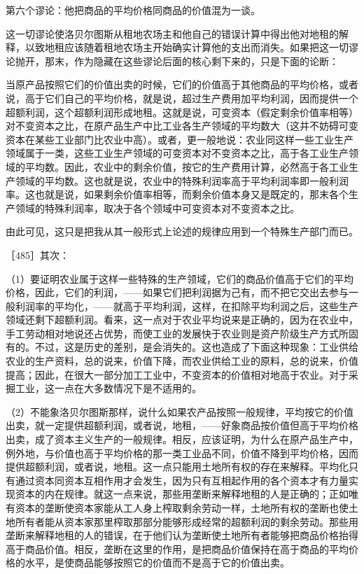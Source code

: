 第六个谬论：他把商品的平均价格同商品的价值混为一谈。

这一切谬论使洛贝尔图斯从租地农场主和他自己的错误计算中得出他对地租的解释，以致地租应该随着租地农场主开始确实计算他的支出而消失。如果把这一切谬论抛开，那末，作为隐藏在这些谬论后面的核心剩下来的，只是下面的论断：

当原产品按照它们的价值出卖的时候，它们的价值高于其他商品的平均价格，或者说，高于它们自己的平均价格，就是说，超过生产费用加平均利润，因而提供一个超额利润，这个超额利润形成地租。这就是说，可变资本（假定剩余价值率相等）对不变资本之比，在原产品生产中比工业各生产领域的平均数大（这并不妨碍可变资本在某些工业部门比农业中高）。或者，更一般地说：农业同这样一些工业生产领域属于一类，这些工业生产领域的可变资本对不变资本之比，高于各工业生产领域的平均数。因此，农业中的剩余价值，按它的生产费用计算，必然高于各工业生产领域的平均数。这也就是说，农业中的特殊利润率高于平均利润率即一般利润率。这也就是说，如果剩余价值率相等，而剩余价值本身又是既定的，那末各个生产领域的特殊利润率，取决于各个领域中可变资本对不变资本之比。

由此可见，这只是把我从其一般形式上论述的规律应用到一个特殊生产部门而已。

［485］其次：

（1）要证明农业属于这样一些特殊的生产领域，它们的商品价值高于它们的平均价格，因此，它们的利润，——如果它们把利润据为己有，而不把它交出去参与一般利润率的平均化，——就高于平均利润，这样，在扣除平均利润之后，这些生产领域还剩下超额利润。看来，这一点对于农业平均说来是正确的，因为在农业中，手工劳动相对地说还占优势，而使工业的发展快于农业则是资产阶级生产方式所固有的。不过，这是历史的差别，是会消失的。这也造成了下面这种现象：工业供给农业的生产资料，总的说来，价值下降，而农业供给工业的原料，总的说来，价值提高；因此，在很大一部分加工工业中，不变资本的价值相对地高于农业。对于采掘工业，这一点在大多数情况下是不适用的。

（2）不能象洛贝尔图斯那样，说什么如果农产品按照一般规律，平均按它的价值出卖，就一定提供超额利润，或者说，地租，——好象商品按价值但高于平均价格出卖，成了资本主义生产的一般规律。相反，应该证明，为什么在原产品生产中，例外地，与价值也高于平均价格的那一类工业品不同，价值不降到平均价格，因而提供超额利润，或者说，地租。这一点只能用土地所有权的存在来解释。平均化只有通过资本同资本互相作用才会发生，因为只有互相起作用的各个资本才有力量实现资本的内在规律。就这一点来说，那些用垄断来解释地租的人是正确的；正如唯有资本的垄断使资本家能从工人身上榨取剩余劳动一样，土地所有权的垄断也使土地所有者能从资本家那里榨取那部分能够形成经常的超额利润的剩余劳动。那些用垄断来解释地租的人的错误，在于他们认为垄断使土地所有者能够把商品价格抬得高于商品价值。相反，垄断在这里的作用，是把商品价值保持在高于商品的平均价格的水平，是使商品能够按照它的价值而不是高于它的价值出卖。


